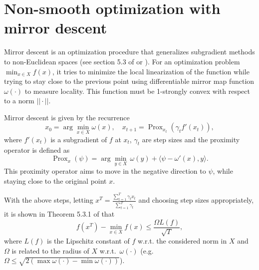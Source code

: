 \documentclass{article}
\DeclareMathOperator{\Tr}{Tr}
\DeclareMathOperator{\Prox}{Prox}
\begin{document}
\begin{comment}
Secondly, note that ideally, we have $M = u u^\prime$, where $u \in \{0,1\}^n$ is $K$-sparse. Note that this implies
\[ \left( \sum_i u_i \right)^2 \leq K \left( \sum_i u_i^2 \right), \]
which can be seen easily by induction over $K$. Expanding above inequality, we have
\[ \sum_{i,j} u_i u_j \leq K \sum_i u_i^2. \]
This in turn corresponds to the following constraint on $M$
\[ \sum_{i,j} M_{ij} \leq K \sum_i M_{ii}, \]
and considering that we have $\Tr(M) = 1$, this is equivalent to $J \cdot M \leq K$, where $J \triangleq 1_n 1_n^\prime$. Then a new formulation with the additional constraints is
\begin{align}\label{eq:opt_add}
  \max_{M \in \Delta_n} \quad C \cdot M \quad \mathrm{s.t.\ } \quad & Q(M) \succeq 0, \quad M \geq 0, \quad J \cdot M \geq 0.
\end{align}

\end{comment}



\section{Non-smooth optimization with mirror descent}

Mirror descent is an optimization procedure that generalizes subgradient methods to non-Euclidean spaces (see section 5.3 of \cite{lectures} or \cite{blog}). For an optimization problem $\min_{x \in X} f(x)$, it tries to minimize the local linearization of the function while trying to stay close to the previous point using  differentiable mirror map function $\omega(\cdot)$ to measure locality. This function must be 1-strongly convex with respect to a norm $||\cdot||$.

Mirror descent is given by the recurrence
\[ x_0 = \arg\min_{x \in X} \omega(x), \quad x_{t+1} = \Prox_{x_t}(\gamma_t f'(x_t)), \]
where $f'(x_t)$ is a subgradient of $f$ at $x_t$, $\gamma_t$ are step sizes and the proximity operator is defined as
\[ \Prox_{x}(\psi ) = \arg\min_{y \in X} \, \omega(y) + \langle \psi - \omega'(x), y \rangle. \]
This proximity operator aims to move in the negative direction to $\psi$, while staying close to the original point $x$.

With the above steps, letting $x^T = \frac{\sum_{t=1}^T \gamma_t x_t}{\sum_{t=1}^T \gamma_t}$ and choosing step sizes appropriately, it is shown in Theorem 5.3.1 of \cite{lectures} that
\[ f(x^T) - \min_{x \in X} f(x) \leq \frac{\Omega L(f)}{\sqrt{T}}, \]
where $L(f)$ is the Lipschitz constant of $f$ w.r.t. the considered norm in $X$ and $\Omega$ is related to the radius of $X$ w.r.t.\ $\omega(\cdot)$ (e.g.\ $\Omega \leq \sqrt{2 (\max \omega(\cdot) - \min \omega(\cdot))}$).
\end{document}
